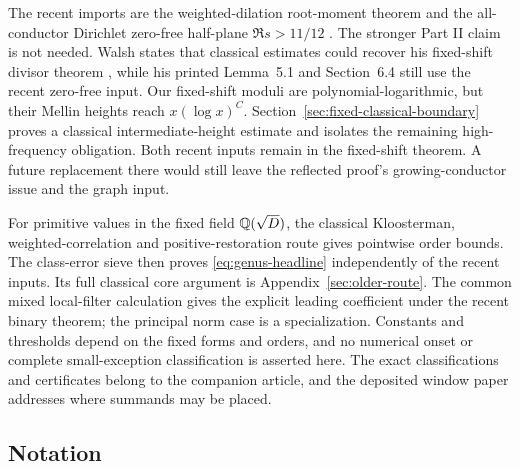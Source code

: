 The recent imports are the weighted-dilation root-moment theorem
\cite[Section 3]{weightedgraphs} and the all-conductor Dirichlet
zero-free half-plane \(\Re s>11/12\)
\cite[Part I, Theorem 3.1]{zerofree}. The stronger Part II claim is
not needed. Walsh states that classical estimates could recover his
fixed-shift divisor theorem \cite[p.~2]{walsh}, while his printed
Lemma~5.1 and Section~6.4 still use the recent zero-free input.
Our fixed-shift moduli are polynomial-logarithmic, but their Mellin
heights reach \(x(\log x)^C\). Section~\ref{sec:fixed-classical-boundary}
proves a classical intermediate-height estimate and isolates the
remaining high-frequency obligation. Both recent inputs remain in
the fixed-shift theorem. A future replacement there would still leave
the reflected proof's growing-conductor issue and the graph input.

For primitive values in the fixed field \(\mathbb Q(\sqrt D)\), the classical
Kloosterman, weighted-correlation and positive-restoration route gives
pointwise order bounds. The class-error sieve then proves
\eqref{eq:genus-headline} independently of the recent inputs.
Its full classical core argument is Appendix~\ref{sec:older-route}.
The common mixed local-filter calculation gives the explicit leading
coefficient under the recent binary theorem; the principal norm case
is a specialization. Constants and thresholds depend on the fixed
forms and orders, and no numerical onset or complete small-exception
classification is asserted here. The exact classifications and
certificates belong to the companion article, and the deposited
window paper addresses where summands may be placed.

\subsection{Notation}

